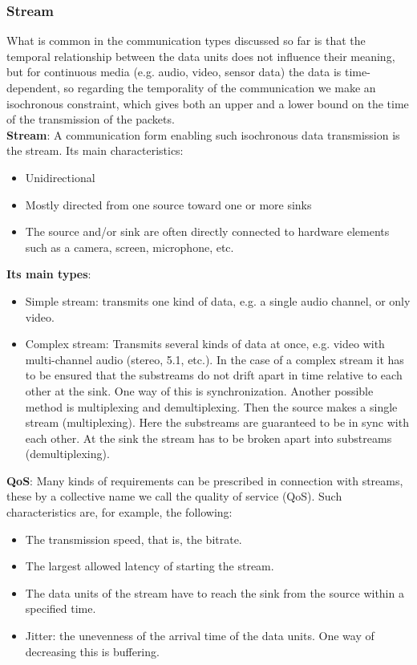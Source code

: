 \documentclass[margin=0px]{article}
\begin{document}
\subsubsection{Stream}

What is common in the communication types discussed so far is that the temporal relationship between the data units does not influence
their meaning, but for continuous media (e.g. audio, video, sensor data) the data is time-dependent, so regarding the
temporality of the communication we make an isochronous constraint, which gives both an upper and a lower bound
on the time of the transmission of the packets.\\

\noindent \textbf{Stream}: A communication form enabling such isochronous data transmission is the stream. Its main characteristics:
\begin{itemize}
    \item	Unidirectional
    \item	Mostly directed from one source toward one or more sinks
    \item	The source and/or sink are often directly connected to hardware elements such as a camera, screen,
          microphone, etc.
\end{itemize}

\noindent \textbf{Its main types}:
\begin{itemize}
    \item	Simple stream: transmits one kind of data, e.g. a single audio channel, or only video.
    \item	Complex stream: Transmits several kinds of data at once, e.g. video with multi-channel audio (stereo, 5.1, etc.).
          In the case of a complex stream it has to be ensured that the substreams do not drift apart in time relative to each other at the sink.
          One way of this is synchronization. Another possible method is multiplexing and demultiplexing. Then the source
          makes a single stream (multiplexing). Here the substreams are guaranteed to be in sync with each other. At the sink the
          stream has to be broken apart into substreams (demultiplexing).
\end{itemize}

\noindent \textbf{QoS}: Many kinds of requirements can be prescribed in connection with streams, these by a collective name
we call the quality of service (QoS). Such characteristics are, for example, the following:

\begin{itemize}
    \item	The transmission speed, that is, the bitrate.
    \item	The largest allowed latency of starting the stream.
    \item	The data units of the stream have to reach the sink from the source within a specified time.
    \item	Jitter: the unevenness of the arrival time of the data units. One way of decreasing this
          is buffering.
\end{itemize}
\end{document}
